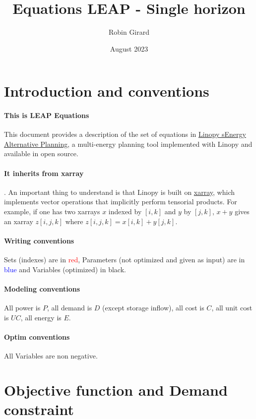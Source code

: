 \documentclass[a4paper,11pt]{article}
\title{Equations LEAP - Single horizon}
\author{Robin Girard }
\date{August 2023}
\begin{document}
\maketitle
\tableofcontents
\footnotesize
\section{Introduction and conventions}
\paragraph{This is LEAP Equations} This document provides a description of the set of equations in \href{https://github.com/robingirard/Energy-Alternatives-Planning/blob/master/Models/Linopy/f_planningModels_linopy.py}{Linopy sEnergy Alternative Planning}, a multi-energy planning tool implemented with Linopy and available in open source. 
\\

\paragraph{It inherits from xarray}. An important thing to understand is that Linopy is built on \href{https://docs.xarray.dev/en/stable/}{xarray}, which implements vector operations that implicitly perform tensorial products. For example, if one has two xarrays $x$ indexed by $[i,k]$ and $y$ by $[j, k]$, $x + y$ gives an xarray $z[i,j,k]$ where $z[i,j,k] = x[i,k]+ y[j,k]$.


\paragraph{Writing conventions}
Sets (indexes) are in \textcolor{red}{red}, Parameters (not optimized and given as input) are in \textcolor{blue}{blue} and Variables (optimized) in black.

\paragraph{Modeling conventions}
All power is $P$, all demand is $D$ (except storage inflow), all cost is $C$, all unit cost is $UC$, all energy is $E$. 

\paragraph{Optim conventions}
All Variables are non negative. 


\newpage
\section{Objective function and Demand constraint}
\end{document}
